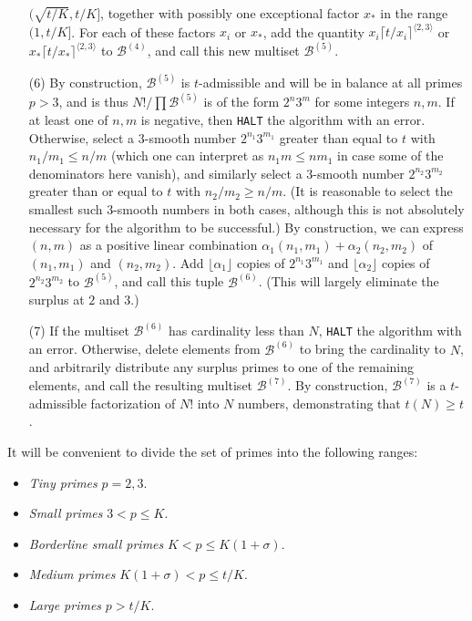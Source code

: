\documentclass[12pt,a4paper,reqno]{amsart}
\numberwithin{equation}{section}
\theoremstyle{plain}
\theoremstyle{definition}
\newcommand\tuple{{\mathcal B}}
\begin{document}
\begin{enumerate}
$(\sqrt{t/K}, t/K]$, together with possibly one exceptional factor $x_*$ in the range $(1, t/K]$.  For each of these factors $x_i$ or $x_*$, add the quantity $x_i \lceil t/x_i \rceil^{\langle 2,3 \rangle}$ or $x_* \lceil t/x_* \rceil^{\langle 2,3 \rangle}$ to $\tuple^{(4)}$, and call this new multiset $\tuple^{(5)}$.  
\item[(6)] By construction, $\tuple^{(5)}$ is $t$-admissible and will be in balance at all primes $p>3$, and is thus $N!/\prod \tuple^{(5)}$ is of the form $2^n 3^m$ for some integers $n,m$.  If at least one of $n,m$ is negative, then \texttt{HALT} the algorithm with an error.  Otherwise, select a $3$-smooth number $2^{n_1} 3^{m_1}$ greater than equal to $t$ with $n_1/m_1 \leq n/m$ (which one can interpret as $n_1 m \leq nm_1$ in case some of the denominators here vanish), and similarly select a $3$-smooth number $2^{n_2} 3^{m_2}$ greater than or equal to $t$ with $n_2/m_2 \geq n/m$.  (It is reasonable to select the smallest such $3$-smooth numbers in both cases, although this is not absolutely necessary for the algorithm to be successful.) By construction, we can express $(n,m)$ as a positive linear combination $\alpha_1 (n_1,m_1) + \alpha_2 (n_2,m_2)$ of $(n_1,m_1)$ and $(n_2,m_2)$.  Add $\lfloor \alpha_1 \rfloor$ copies of $2^{n_1} 3^{m_1}$ and $\lfloor \alpha_2 \rfloor$ copies of $2^{n_2} 3^{m_2}$ to $\tuple^{(5)}$, and call this tuple $\tuple^{(6)}$.  (This will largely eliminate the surplus at $2$ and $3$.)
\item[(7)] If the multiset $\tuple^{(6)}$ has cardinality less than $N$, \texttt{HALT} the algorithm with an error.  Otherwise, delete elements from $\tuple^{(6)}$ to bring the cardinality to $N$, and arbitrarily distribute any surplus primes to one of the remaining elements, and call the resulting multiset $\tuple^{(7)}$.  By construction, $\tuple^{(7)}$ is a $t$-admissible factorization of $N!$ into $N$ numbers, demonstrating that $t(N) \geq t$.
\end{enumerate}

It will be convenient to divide the set of primes into the following ranges:
\begin{itemize}
\item \emph{Tiny primes} $p=2,3$.
\item \emph{Small primes} $3 < p \leq K$.
\item \emph{Borderline small primes} $K < p \leq K(1+\sigma)$.
\item \emph{Medium primes} $K(1+\sigma) < p \leq t/K$.
\item \emph{Large primes} $p > t/K$.
\end{itemize}
\end{document}
